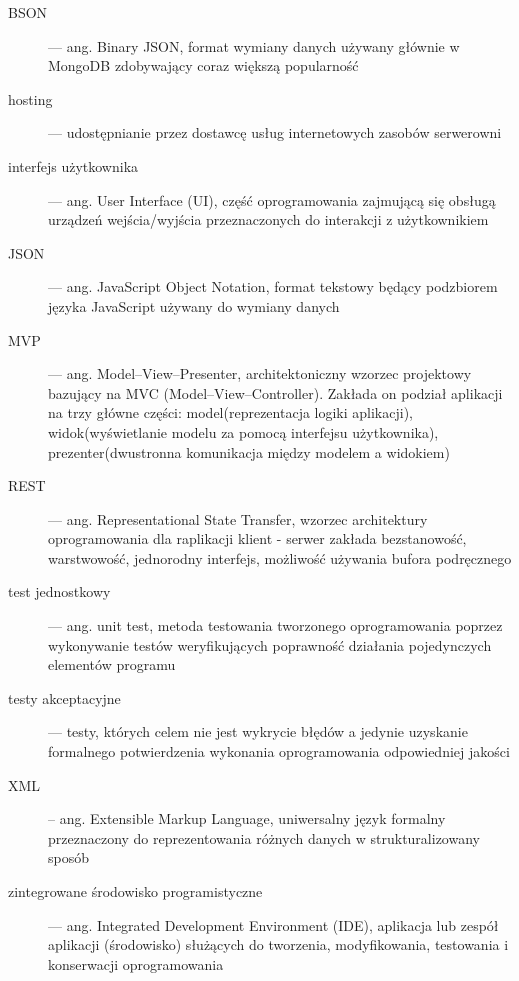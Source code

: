 \documentclass[12pt,leqno, twoside]{mwart}
\begin{document}
	\begin{description}
	
	\item[BSON] --- ang. Binary JSON, format wymiany danych używany głównie w MongoDB zdobywający coraz większą popularność
	
	\item[hosting] --- udostępnianie przez dostawcę usług internetowych zasobów serwerowni
	
	\item[interfejs użytkownika] --- ang. User Interface (UI), część oprogramowania zajmującą się obsługą urządzeń wejścia/wyjścia przeznaczonych do interakcji z użytkownikiem
	
	\item[JSON] --- ang. JavaScript Object Notation, format tekstowy będący podzbiorem języka JavaScript używany do wymiany danych
	
	\item[MVP] --- ang. Model–View–Presenter, architektoniczny wzorzec projektowy bazujący na MVC (Model–View–Controller). Zakłada on podział aplikacji na trzy główne części: model(reprezentacja logiki aplikacji), widok(wyświetlanie modelu za pomocą interfejsu użytkownika), prezenter(dwustronna komunikacja między modelem a widokiem)

	\item[REST] --- ang. Representational State Transfer, wzorzec architektury oprogramowania dla raplikacji klient - serwer zakłada bezstanowość, warstwowość, jednorodny interfejs, możliwość używania bufora podręcznego
	
	\item[test jednostkowy] --- ang. unit test, metoda testowania tworzonego oprogramowania poprzez wykonywanie testów weryfikujących poprawność działania pojedynczych elementów programu
	
	\item[testy akceptacyjne] --- testy, których celem nie jest wykrycie błędów a jedynie uzyskanie formalnego potwierdzenia wykonania oprogramowania odpowiedniej jakości
	
	\item[XML] -- ang. Extensible Markup Language, uniwersalny język formalny przeznaczony do reprezentowania różnych danych w strukturalizowany sposób
	
	\item[zintegrowane środowisko programistyczne] --- ang. Integrated Development Environment (IDE), aplikacja lub zespół aplikacji (środowisko) służących do tworzenia, modyfikowania, testowania i konserwacji oprogramowania
	
	\end{description}
\end{document}
